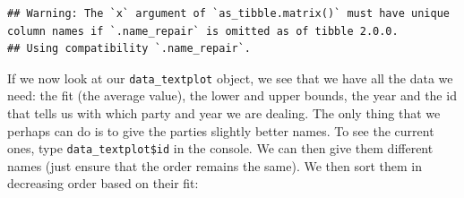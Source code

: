 \documentclass[
]{book}
\newenvironment{Shaded}{\begin{snugshade}}{\end{snugshade}}
\newcommand{\AttributeTok}[1]{\textcolor[rgb]{0.77,0.63,0.00}{#1}}
\newcommand{\DecValTok}[1]{\textcolor[rgb]{0.00,0.00,0.81}{#1}}
\newcommand{\FunctionTok}[1]{\textcolor[rgb]{0.00,0.00,0.00}{#1}}
\newcommand{\NormalTok}[1]{#1}
\newcommand{\OtherTok}[1]{\textcolor[rgb]{0.56,0.35,0.01}{#1}}
\newcommand{\SpecialCharTok}[1]{\textcolor[rgb]{0.00,0.00,0.00}{#1}}
\newcommand{\StringTok}[1]{\textcolor[rgb]{0.31,0.60,0.02}{#1}}
\begin{document}
\begin{Shaded}
\end{Shaded}

\begin{verbatim}
## Warning: The `x` argument of `as_tibble.matrix()` must have unique column names if `.name_repair` is omitted as of tibble 2.0.0.
## Using compatibility `.name_repair`.
\end{verbatim}

If we now look at our \texttt{data\_textplot} object, we see that we have all the data we need: the fit (the average value), the lower and upper bounds, the year and the id that tells us with which party and year we are dealing. The only thing that we perhaps can do is to give the parties slightly better names. To see the current ones, type \texttt{data\_textplot\$id} in the console. We can then give them different names (just ensure that the order remains the same). We then sort them in decreasing order based on their fit:

\begin{Shaded}
\end{Shaded}
\end{document}
